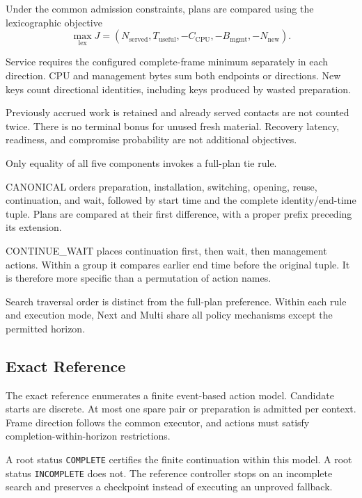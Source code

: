 \documentclass[conference]{IEEEtran}
\newcommand{\op}[1]{\texttt{#1}}
\begin{document}
Under the common admission constraints, plans are compared
using the lexicographic objective
\begin{equation}
    \max_{\mathrm{lex}} J
    =
    \left(
        N_{\mathrm{served}},
        T_{\mathrm{useful}},
        -C_{\mathrm{CPU}},
        -B_{\mathrm{mgmt}},
        -N_{\mathrm{new}}
    \right).
    \label{eq:objective}
\end{equation}

Service requires the configured complete-frame minimum
separately in each direction.
CPU and management bytes sum both endpoints or directions.
New keys count directional identities, including keys produced
by wasted preparation.

Previously accrued work is retained and already served
contacts are not counted twice.
There is no terminal bonus for unused fresh material.
Recovery latency, readiness, and compromise probability are
not additional objectives.

Only equality of all five components invokes a full-plan
tie rule.

CANONICAL orders preparation, installation, switching,
opening, reuse, continuation, and wait, followed by start time
and the complete identity/end-time tuple.
Plans are compared at their first difference, with a proper
prefix preceding its extension.

CONTINUE\_WAIT places continuation first, then wait, then
management actions.
Within a group it compares earlier end time before the original
tuple.
It is therefore more specific than a permutation of action names.

Search traversal order is distinct from the full-plan preference.
Within each rule and execution mode, Next and Multi share
all policy mechanisms except the permitted horizon.

\subsection{Exact Reference}

The exact reference enumerates a finite event-based action
model.
Candidate starts are discrete.
At most one spare pair or preparation is admitted per context.
Frame direction follows the common executor, and actions
must satisfy completion-within-horizon restrictions.

A root status \op{COMPLETE} certifies the finite continuation
within this model.
A root status \op{INCOMPLETE} does not.
The reference controller stops on an incomplete search and
preserves a checkpoint instead of executing an unproved fallback.
\end{document}
